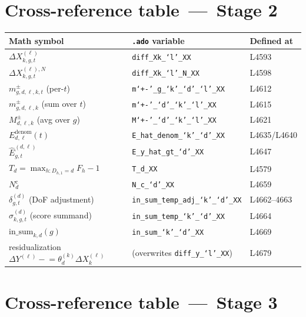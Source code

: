 \documentclass[11pt]{article}
\newcommand{\code}[1]{\texttt{\small #1}}
\newcommand{\1}{\mathbb{1}}
\begin{document}
\section[Cross-reference table (Stage 2)]{Cross-reference table \,---\, Stage 2}

\noindent\begin{tabular}{@{}lll@{}}
\toprule
Math symbol & \texttt{.ado} variable & Defined at \\
\midrule
$\Delta X^{(\ell)}_{k,g,t}$                & \code{diff\_X{k}\_`l'\_XX}           & L4593 \\
$\Delta X^{(\ell),N}_{k,g,t}$              & \code{diff\_X{k}\_`l'\_N\_XX}        & L4598 \\
$m^{\pm}_{g,d,\ell,k,t}$ (per-$t$)         & \code{m`+\!-'\_g\_`k'\_`d'\_`l'\_XX} & L4612 \\
$m^{\pm}_{g,d,\ell,k}$ (sum over $t$)      & \code{m`+\!-'\_`d'\_`k'\_`l'\_XX}    & L4615 \\
$M^{\pm}_{d,\ell,k}$ (avg over $g$)        & \code{M`+\!-'\_`d'\_`k'\_`l'\_XX}    & L4621 \\
$E^{\mathrm{denom}}_{d,\ell}(t)$           & \code{E\_hat\_denom\_`k'\_`d'\_XX}   & L4635/L4640 \\
$\widehat{E}^{(d,\ell)}_{g,t}$             & \code{E\_y\_hat\_gt\_`d'\_XX}        & L4647 \\
$T_d = \max_{h:D_{h,1}=d} F_h - 1$         & \code{T\_d\_XX}                      & L4579 \\
$N^{\mathrm{c}}_d$                         & \code{N\_c\_`d'\_XX}                 & L4659 \\
$\delta^{(d)}_{g,t}$ (DoF adjustment)      & \code{in\_sum\_temp\_adj\_`k'\_`d'\_XX} & L4662--4663 \\
$\sigma^{(d)}_{k,g,t}$ (score summand)     & \code{in\_sum\_temp\_`k'\_`d'\_XX}   & L4664 \\
$\mathrm{in\_sum}_{k,d}(g)$                & \code{in\_sum\_`k'\_`d'\_XX}         & L4669 \\
residualization $\Delta Y^{(\ell)} \mathrel{-}{=} \theta_d^{(k)}\Delta X^{(\ell)}_k$ & (overwrites \code{diff\_y\_`l'\_XX}) & L4679 \\
\bottomrule
\end{tabular}

\section[Cross-reference table (Stage 3)]{Cross-reference table \,---\, Stage 3}
\end{document}
